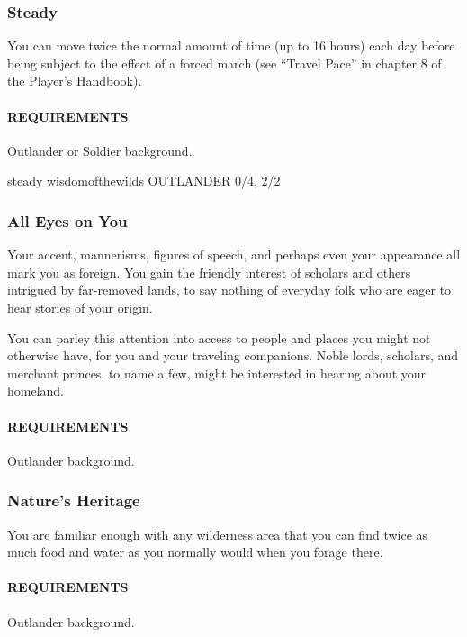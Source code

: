     \subsubsection{Steady} \label{feat::steady}
        You can move twice the normal amount of time (up to 16 hours) each day before being subject to the effect of a forced march (see ``Travel Pace'' in chapter 8 of the Player's Handbook).
        \paragraph{REQUIREMENTS} Outlander or Soldier background.

steady wisdomofthewilds
OUTLANDER 0/4, 2/2
    \subsubsection{All Eyes on You} \label{feat::alleyesonyou}
        Your accent, mannerisms, figures of speech, and perhaps even your appearance all mark you as foreign.
        You gain the friendly interest of scholars and others intrigued by far-removed lands, to say nothing of everyday folk who are eager to hear stories of your origin.

        You can parley this attention into access to people and places you might not otherwise have, for you and your traveling companions.
        Noble lords, scholars, and merchant princes, to name a few, might be interested in hearing about your homeland.
        \paragraph{REQUIREMENTS} Outlander background.

    \subsubsection{Nature's Heritage} \label{feat::naturesheritage}
        You are familiar enough with any wilderness area that you can find twice as much food and water as you normally would when you forage there.
        \paragraph{REQUIREMENTS} Outlander background.


